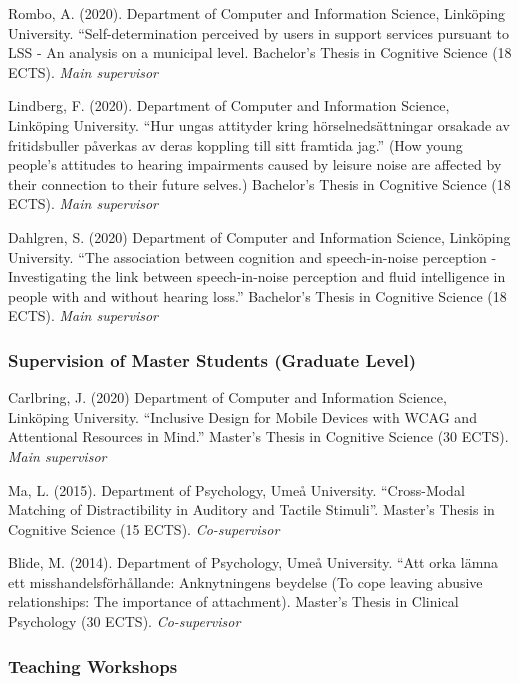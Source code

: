 \documentclass[]{article}
\begin{document}
Rombo, A. (2020). Department of Computer and Information Science,
Linköping University. ``Self-determination perceived by users in support
services pursuant to LSS - An analysis on a municipal level. Bachelor's
Thesis in Cognitive Science (18 ECTS). \emph{Main supervisor}

Lindberg, F. (2020). Department of Computer and Information Science,
Linköping University. ``Hur ungas attityder kring hörselnedsättningar
orsakade av fritidsbuller påverkas av deras koppling till sitt framtida
jag.'' (How young people's attitudes to hearing impairments caused by
leisure noise are affected by their connection to their future selves.)
Bachelor's Thesis in Cognitive Science (18 ECTS). \emph{Main supervisor}

Dahlgren, S. (2020) Department of Computer and Information Science,
Linköping University. ``The association between cognition and
speech-in-noise perception - Investigating the link between
speech-in-noise perception and fluid intelligence in people with and
without hearing loss.'' Bachelor's Thesis in Cognitive Science (18
ECTS). \emph{Main supervisor}

\hypertarget{supervision-of-master-students-graduate-level}{%
\subsubsection{Supervision of Master Students (Graduate
Level)}\label{supervision-of-master-students-graduate-level}}

Carlbring, J. (2020) Department of Computer and Information Science,
Linköping University. ``Inclusive Design for Mobile Devices with WCAG
and Attentional Resources in Mind.'' Master's Thesis in Cognitive
Science (30 ECTS). \emph{Main supervisor}

Ma, L. (2015). Department of Psychology, Umeå University. ``Cross-Modal
Matching of Distractibility in Auditory and Tactile Stimuli''. Master's
Thesis in Cognitive Science (15 ECTS). \emph{Co-supervisor}

Blide, M. (2014). Department of Psychology, Umeå University. ``Att orka
lämna ett misshandelsförhållande: Anknytningens beydelse (To cope
leaving abusive relationships: The importance of attachment). Master's
Thesis in Clinical Psychology (30 ECTS). \emph{Co-supervisor}

\hypertarget{teaching-workshops}{%
\subsubsection{Teaching Workshops}\label{teaching-workshops}}
\end{document}
